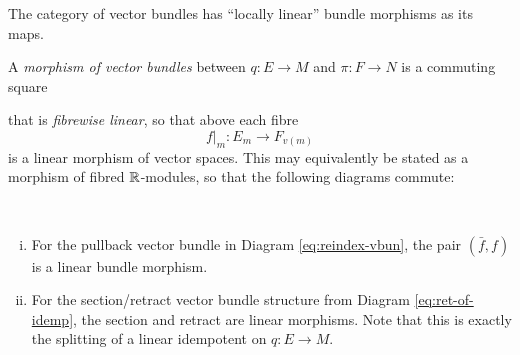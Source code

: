 The category of vector bundles has ``locally linear'' bundle morphisms as its maps.
\begin{definition}
  A \emph{morphism of vector bundles} between $q:E \to M$ and $\pi:F \to N$ is a commuting square
  
  that is \emph{fibrewise linear}, so that above each fibre \[  f|_m: E_m \to F_{v(m)} \] is a linear morphism of vector spaces. This may equivalently be stated as a morphism of fibred $\mathbb{R}$-modules, so that the following diagrams commute:
  \[\]
\end{definition}
\begin{example}
  ~\begin{enumerate}[(i)]
    \item For the pullback vector bundle in Diagram \ref{eq:reindex-vbun}, the pair $(\bar{f},f)$ is a linear bundle morphism.
    \item For the section/retract vector bundle structure from Diagram \ref{eq:ret-of-idemp}, the section and retract are linear morphisms. 
    Note that this is exactly the splitting of a linear idempotent on $q:E \to M$.
  \end{enumerate}
\end{example}

